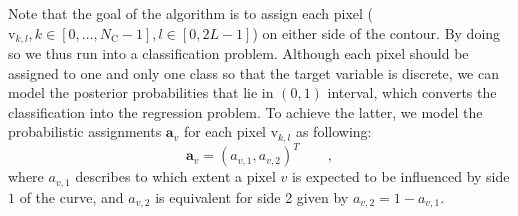 \documentclass[conference]{IEEEtran}
\begin{document}
Note that the goal of the algorithm is to assign each pixel
($\mathrm{v}_{k,l}, k \in [0,\ldots,N_{\mathrm{C}}-1], l \in [0,
2L-1]$) on either side of the contour. By doing so we thus run into a
classification problem.
Although each pixel should be assigned to one and only
one class so that the target variable is discrete, we can model the
posterior probabilities that lie in $(0,1)$ interval, which converts the classification into the regression problem. To achieve the latter, we model the probabilistic
assignments $\mathbf{a}_{v}$ for each pixel $\mathrm{v}_{k,l}$ as following:
\begin{equation}
  \label{eq:pa}
  \mathbf{a}_v  = (a_{v,1}, a_{v,2})^T\qquad,
\end{equation}
where $a_{v,1}$ describes to which extent a pixel $v$ is expected to
be influenced by side $1$ of the curve, and $a_{v,2}$ is equivalent
for side 2 given by $a_{v,2} = 1- a_{v,1}$. 



\end{document}
